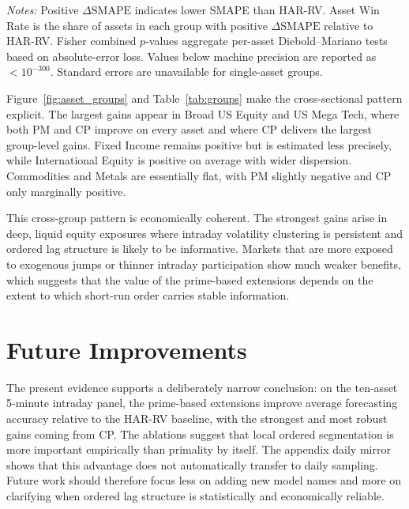 ﻿\documentclass[a4paper]{article}
\begin{document}
\clearpage

{\renewcommand{\thetable}{5}
\begin{center}
\label{tab:groups}
\small
\renewcommand{\arraystretch}{1.15}
\setlength{\tabcolsep}{8pt}
\resizebox{0.88\textwidth}{!}{}

\vspace{0.1cm}
\footnotesize \parbox{0.92\textwidth}{\textit{Notes:} Positive $\Delta \mathrm{SMAPE}$ indicates lower SMAPE than HAR-RV. Asset Win Rate is the share of assets in each group with positive $\Delta \mathrm{SMAPE}$ relative to HAR-RV. Fisher combined $p$-values aggregate per-asset Diebold--Mariano tests based on absolute-error loss. Values below machine precision are reported as $< 10^{-300}$. Standard errors are unavailable for single-asset groups.}
\end{center}}

\noindent
Figure~\ref{fig:asset_groups} and Table~\ref{tab:groups} make the cross-sectional pattern explicit. The largest gains appear in Broad US Equity and US Mega Tech, where both PM and CP improve on every asset and where CP delivers the largest group-level gains. Fixed Income remains positive but is estimated less precisely, while International Equity is positive on average with wider dispersion. Commodities and Metals are essentially flat, with PM slightly negative and CP only marginally positive.

\noindent
This cross-group pattern is economically coherent. The strongest gains arise in deep, liquid equity exposures where intraday volatility clustering is persistent and ordered lag structure is likely to be informative. Markets that are more exposed to exogenous jumps or thinner intraday participation show much weaker benefits, which suggests that the value of the prime-based extensions depends on the extent to which short-run order carries stable information.


\section{Future Improvements}

\noindent
The present evidence supports a deliberately narrow conclusion: on the ten-asset 5-minute intraday panel, the prime-based extensions improve average forecasting accuracy relative to the HAR-RV baseline, with the strongest and most robust gains coming from CP. The ablations suggest that local ordered segmentation is more important empirically than primality by itself. The appendix daily mirror shows that this advantage does not automatically transfer to daily sampling. Future work should therefore focus less on adding new model names and more on clarifying when ordered lag structure is statistically and economically reliable.
\end{document}

